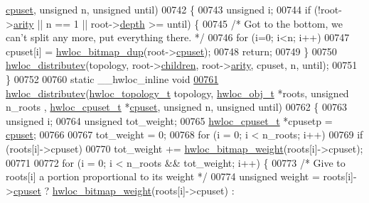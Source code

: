 \begin{DoxyCode}
      \hyperlink{a00016_a67925e0f2c47f50408fbdb9bddd0790f}{cpuset}, \textcolor{keywordtype}{unsigned} n, \textcolor{keywordtype}{unsigned} until)
00742 \{
00743   \textcolor{keywordtype}{unsigned} i;
00744   \textcolor{keywordflow}{if} (!root->\hyperlink{a00016_aac3f6da35c9b57599909a44ce2b716c1}{arity} || n == 1 || root->\hyperlink{a00016_a9d82690370275d42d652eccdea5d3ee5}{depth} >= until) \{
00745     \textcolor{comment}{/* Got to the bottom, we can't split any more, put everything there.  */}
00746     \textcolor{keywordflow}{for} (i=0; i<n; i++)
00747       cpuset[i] = \hyperlink{a00065_gaaa4ed76211cd3694dfbea2109fc440be}{hwloc_bitmap_dup}(root->\hyperlink{a00016_a67925e0f2c47f50408fbdb9bddd0790f}{cpuset});
00748     \textcolor{keywordflow}{return};
00749   \}
00750   \hyperlink{a00059_gaf057d7c5e3cb3df897ce527258537619}{hwloc_distributev}(topology, root->\hyperlink{a00016_a04d05403da37bfe17cd63b7c7dd07b1f}{children}, root->\hyperlink{a00016_aac3f6da35c9b57599909a44ce2b716c1}{arity}, cpuset, n, until);
00751 \}
00752 
00760 \textcolor{keyword}{static} \_\_hwloc\_inline \textcolor{keywordtype}{void}
\hypertarget{a00031_source_l00761}{}\hyperlink{a00059_gaf057d7c5e3cb3df897ce527258537619}{00761} \hyperlink{a00059_gaf057d7c5e3cb3df897ce527258537619}{hwloc_distributev}(\hyperlink{a00039_ga9d1e76ee15a7dee158b786c30b6a6e38}{hwloc_topology_t} topology, \hyperlink{a00016}{hwloc_obj_t} *roots, \textcolor{keywordtype}{unsigned} n\_roots
      , \hyperlink{a00040_ga4bbf39b68b6f568fb92739e7c0ea7801}{hwloc_cpuset_t} *\hyperlink{a00016_a67925e0f2c47f50408fbdb9bddd0790f}{cpuset}, \textcolor{keywordtype}{unsigned} n, \textcolor{keywordtype}{unsigned} until)
00762 \{
00763   \textcolor{keywordtype}{unsigned} i;
00764   \textcolor{keywordtype}{unsigned} tot\_weight;
00765   \hyperlink{a00040_ga4bbf39b68b6f568fb92739e7c0ea7801}{hwloc_cpuset_t} *cpusetp = \hyperlink{a00016_a67925e0f2c47f50408fbdb9bddd0790f}{cpuset};
00766 
00767   tot\_weight = 0;
00768   \textcolor{keywordflow}{for} (i = 0; i < n\_roots; i++)
00769     \textcolor{keywordflow}{if} (roots[i]->cpuset)
00770       tot\_weight += \hyperlink{a00065_ga12d520387be74f849f191d7a06ac325c}{hwloc_bitmap_weight}(roots[i]->cpuset);
00771 
00772   \textcolor{keywordflow}{for} (i = 0; i < n\_roots && tot\_weight; i++) \{
00773     \textcolor{comment}{/* Give to roots[i] a portion proportional to its weight */}
00774     \textcolor{keywordtype}{unsigned} weight = roots[i]->\hyperlink{a00016_a67925e0f2c47f50408fbdb9bddd0790f}{cpuset} ? \hyperlink{a00065_ga12d520387be74f849f191d7a06ac325c}{hwloc_bitmap_weight}(roots[i]->cpuset) : 

\end{DoxyCode}
